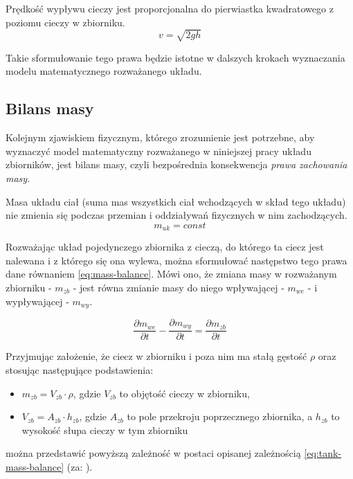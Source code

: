 \begin{torricelli}
    Prędkość wypływu cieczy jest proporcjonalna do pierwiastka kwadratowego z poziomu cieczy w zbiorniku.
    \begin{equation}\label{eq:torricelli}
    v = \sqrt{2gh}
    \end{equation}
\end{torricelli}
Takie sformułowanie tego prawa będzie istotne w dalszych krokach wyznaczania modelu matematycznego rozważanego układu.


\subsection{Bilans masy}
\label{sub:plyny-bilans}

Kolejnym zjawiskiem fizycznym, którego zrozumienie jest potrzebne, aby wyznaczyć model matematyczny rozważanego w niniejszej pracy układu zbiorników, jest bilans masy, czyli bezpośrednia konsekwencja \emph{prawa zachowania masy}.

\begin{mass}
    Masa układu ciał (suma mas wszystkich ciał wchodzących w skład tego układu) nie zmienia się podczas przemian i oddziaływań fizycznych w nim zachodzących.
    \begin{equation}\label{eq:mass-conservation}
        m_{uk} = const
    \end{equation}
\end{mass}

Rozważając układ pojedynczego zbiornika z cieczą, do którego ta ciecz jest nalewana i z którego się ona wylewa, można sformułować następstwo tego prawa dane równaniem \ref{eq:mass-balance}. Mówi ono, że zmiana masy w rozważanym zbiorniku - $m_{zb}$ - jest równa zmianie masy do niego wpływającej - $m_{we}$ - i wypływającej - $m_{wy}$.

\begin{equation}\label{eq:mass-balance}
    \frac{\partial m_{we}}{\partial t} - \frac{\partial m_{wy}}{\partial t} =\frac{\partial m_{zb}}{\partial t}
\end{equation}

Przyjmując założenie, że ciecz w zbiorniku i poza nim ma stałą gęstość $\rho$ oraz stosując następujące podstawienia:
\begin{itemize}
    \item $m_{zb} = V_{zb}\cdot\rho$, gdzie $V_{zb}$ to objętość cieczy w zbiorniku,
    \item $V_{zb} = A_{zb} \cdot h_{zb}$, gdzie $A_{zb}$ to pole przekroju poprzecznego zbiornika, a $h_{zb}$ to wysokość słupa cieczy w tym zbiorniku
\end{itemize}
można przedstawić powyższą zależność w postaci opisanej zależnością \ref{eq:tank-mass-balance} (za: \cite{Postlethwaite}).

